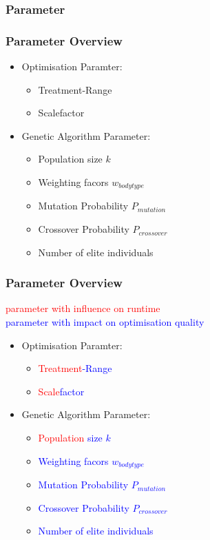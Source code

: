 \documentclass{beamer}
\begin{document}
\subsubsection{Parameter}
\begin{frame}
\frametitle{Parameter Overview}
	\begin{itemize}
	\item Optimisation Paramter:
		\begin{itemize}
		\item Treatment-Range
		\item Scalefactor
		\end{itemize}
	\item Genetic Algorithm Parameter:
		\begin{itemize}
		\item Population size $k$
		\item Weighting facors $w_{bodytype}$
		\item Mutation Probability $P_{mutation}$
		\item Crossover Probability $P_{crossover}$
		\item Number of elite individuals
		\end{itemize}
	\end{itemize}
 
 
\end{frame}

\begin{frame}
\frametitle{Parameter Overview}
\textcolor{red}{parameter with influence on runtime} \\
 \textcolor{blue}{parameter with impact on optimisation quality}  
	\begin{itemize}
	\item Optimisation Paramter:
		\begin{itemize}
		\item \textcolor{red}{Treatment}\textcolor{blue}{-Range}
		\item \textcolor{red}{Scale}\textcolor{blue}{factor}
		\end{itemize}
	\item Genetic Algorithm Parameter:
		\begin{itemize}
		\item \textcolor{red}{Population} \textcolor{blue}{size $k$}
		\item \textcolor{blue}{Weighting facors $w_{bodytype}$}
		\item \textcolor{blue}{Mutation Probability $P_{mutation}$}
		\item \textcolor{blue}{Crossover Probability $P_{crossover}$}
		\item \textcolor{blue}{Number of elite individuals}
		\end{itemize}
	\end{itemize}
 
\end{frame}
\end{document}
